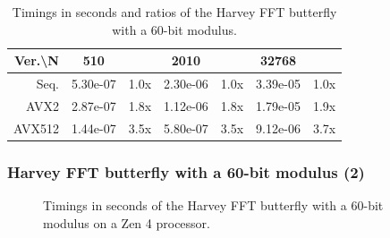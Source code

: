 \documentclass[10pt]{beamer}
\begin{document}
\begin{frame}
\begin{table}[h!]
{\begin{tabular}{|r|*{3}{c c|}}
            \hline
            \rowcolor{myGray}
            Ver.\textbackslash N & 510 & & 2010 & & 32768 & \\
            \hline
            \cellcolor{myGray} Seq. & 5.30e-07 & 1.0x & 2.30e-06 & 1.0x & 3.39e-05 & 1.0x \\
            \hline
            \cellcolor{myGray} AVX2 & 2.87e-07 & 1.8x & 1.12e-06 & 1.8x & 1.79e-05 & 1.9x \\
            \hline
            \cellcolor{myGray} AVX512 & 1.44e-07 & 3.5x & 5.80e-07 & 3.5x & 9.12e-06 & 3.7x \\
            \hline
        \end{tabular}
        }
        \caption{Timings in seconds and ratios of the Harvey FFT butterfly with a 60-bit modulus.}
    \end{table}
\end{frame}

\begin{frame}
    \frametitle{Harvey FFT butterfly with a 60-bit modulus (2)}

    \begin{figure}[h!]
        \begin{center}
        \end{center}
        \caption{Timings in seconds of the Harvey FFT butterfly with a 60-bit modulus on a Zen 4 processor.}
    \end{figure}
\end{frame}
\end{document}
